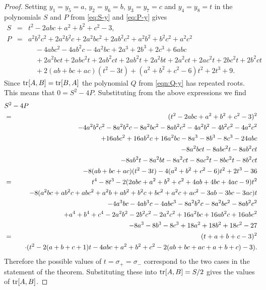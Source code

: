 \documentclass[11pt]{amsart}
\numberwithin{equation}{section}
\begin{document}
\begin{proof}
Setting $y_1=y_5=a$, $y_2=y_6=b$, $y_3=y_7=c$ and $y_4=y_8=t$ in the polynomials $S$ and $P$ 
from \eqref{eq:S-y} and \eqref{eq:P-y} gives
\begin{eqnarray*}
S & = & t^2-2abc+a^2+b^2+c^2-3, \\
P & = & a^2b^2c^2 +2a^2b^2c+2a^2bc^2+2ab^2c^2 +a^2b^2+b^2c^2+a^2c^2  \\
&& \quad -4abc^2-4ab^2c-4a^2bc +2a^3+2b^3+2c^3 +6abc \\
&& \quad + 2a^2bct+2abc^2t+2ab^2ct + 2ab^2t+2a^2bt+2a^2ct+2ac^2t+2bc^2t+2b^2ct \\
&& \quad + 2(ab+bc+ac)(t^2-3t) + (a^2+b^2+c^2-6)t^2+2t^3+9.
\end{eqnarray*}
Since ${\rm tr}[A,B]={\rm tr}[B,A]$ the polynomial $Q$ from \eqref{eqn:Q-y} has repeated roots. This means 
that $0=S^2-4P$. Substituting from the above expressions we find
\begin{eqnarray*}
\lefteqn{S^2-4P} \\ 
& = & (t^2-2abc+a^2+b^2+c^2-3)^2 \\
&& \quad -4a^2b^2c^2 -8a^2b^2c-8a^2bc^2-8ab^2c^2 -4a^2b^2-4b^2c^2-4a^2c^2  \\
&& \quad +16abc^2+16ab^2c+16a^2bc -8a^3-8b^3-8c^3 -24abc \\
&& \quad -8a^2bct-8abc^2t-8ab^2ct \\
&&\quad -8ab^2t-8a^2bt-8a^2ct-8ac^2t-8bc^2t-8b^2ct \\
&& \quad -8(ab+bc+ac)(t^2-3t) -4(a^2+b^2+c^2-6)t^2+2t^3-36 \\
& = & t^4-8t^3-2(2abc+a^2+b^2+c^2+4ab+4bc+4ac-9)t^2\\ 
&& \quad -8(a^2bc+ab^2c+abc^2+a^2b+ab^2+b^2c+bc^2+a^2c+ac^2-3ab-3bc-3ac)t\\ 
&& \quad -4a^3bc-4ab^3c-4abc^3-8a^2b^2c-8a^2bc^2-8ab^2c^2\\ 
&& \quad +a^4+b^4+c^4-2a^2b^2-2b^2c^2-2a^2c^2+16a^2bc+16ab^2c+16abc^2\\ 
&& \quad -8a^3-8b^3-8c^3+18a^2+18b^2+18c^2-27\\ 
& = & (t+a+b+c-3)^2\\ 
&& \quad \cdot (t^2-2(a+b+c+1)t-4abc+a^2+b^2+c^2-2(ab+bc+ac+a+b+c)-3).\nonumber
\end{eqnarray*}
Therefore the possible values of $t=\sigma_+=\sigma_-$ correspond to the two cases in the statement
of the theorem. Substituting these into ${\rm tr}[A,B]=S/2$ gives the values of ${\rm tr}[A,B]$.
\end{proof}
\end{document}
